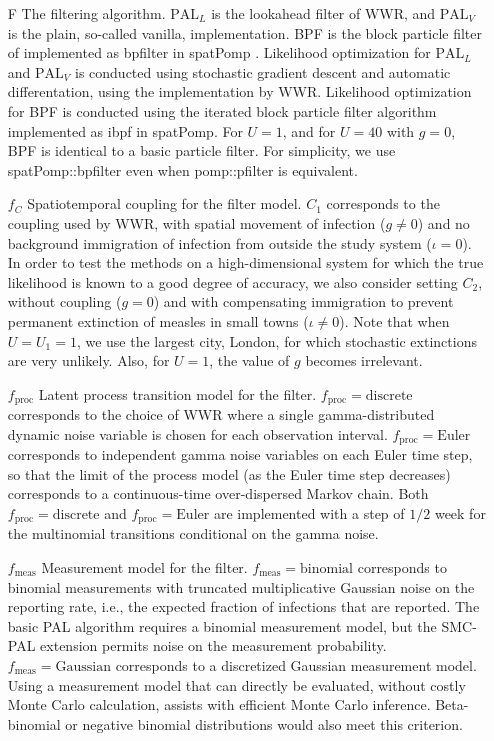 \documentclass{article}
\newcommand\fproc{f_{\mathrm{proc}}}
\newcommand\fmeas{f_{\mathrm{meas}}}
\newcommand\fprocDiscrete{\mathrm{discrete}}
\newcommand\fprocEuler{\mathrm{Euler}}
\newcommand\fmeasBinomial{\mathrm{binomial}}
\newcommand\fmeasGaussian{\mathrm{Gaussian}}
\newcommand\PALL{$\mathrm{PAL}_L$} %
\newcommand\PALV{$\mathrm{PAL}_V$} %
\begin{document}
\begin{itemize}
\item[F] The filtering algorithm. 
{\PALL} is the lookahead filter of WWR, and {\PALV} is the plain, so-called vanilla, implementation. 
BPF is the block particle filter of \citet{rebeschini15} implemented as bpfilter in spatPomp \citep{asfaw24}.
Likelihood optimization for {\PALL} and {\PALV} is conducted using stochastic gradient descent and automatic differentation, using the implementation by WWR. 
Likelihood optimization for BPF is conducted using the iterated block particle filter algorithm \citep{ning23,ionides24} implemented as ibpf in spatPomp.
For $U=1$, and for $U=40$ with $g=0$, BPF is identical to a basic particle filter. 
For simplicity, we use spatPomp::bpfilter even when pomp::pfilter is equivalent.

\item[$f_C$] Spatiotemporal coupling for the filter model. 
$C_1$ corresponds to the coupling used by WWR, with spatial movement of infection ($g\neq 0$) and no background immigration of infection from outside the study system ($\iota=0$). 
In order to test the methods on a high-dimensional system for which the true likelihood is known to a good degree of accuracy, we also consider setting $C_2$, without coupling ($g=0$) and with compensating immigration to prevent permanent extinction of measles in small towns ($\iota\neq 0$).
Note that when $U=U_1=1$, we use the largest city, London, for which stochastic extinctions are very unlikely. 
Also, for $U=1$, the value of $g$ becomes irrelevant.

\item[$\fproc$] Latent process transition model for the filter.
$\fproc=\fprocDiscrete$ corresponds to the choice of WWR where a single gamma-distributed dynamic noise variable is chosen for each observation interval. $\fproc=\fprocEuler$ corresponds to independent gamma noise variables on each Euler time step, so that the limit of the process model (as the Euler time step decreases) corresponds to a continuous-time over-dispersed Markov chain. 
Both $\fproc=\fprocDiscrete$ and $\fproc=\fprocEuler$ are implemented with a step of $1/2$ week for the multinomial transitions conditional on the gamma noise. 

\item[$\fmeas$] Measurement model for the filter. $\fmeas=\fmeasBinomial$ corresponds to binomial measurements with truncated multiplicative Gaussian noise on the reporting rate, i.e., the expected fraction of infections that are reported. 
The basic PAL algorithm requires a binomial measurement model, but the SMC-PAL extension permits noise on the measurement probability.
$\fmeas=\fmeasGaussian$ corresponds to a discretized Gaussian measurement model. 
Using a measurement model that can directly be evaluated, without costly Monte Carlo calculation, assists with efficient Monte Carlo inference.
Beta-binomial or negative binomial distributions would also meet this criterion.


\end{itemize}
\end{document}
